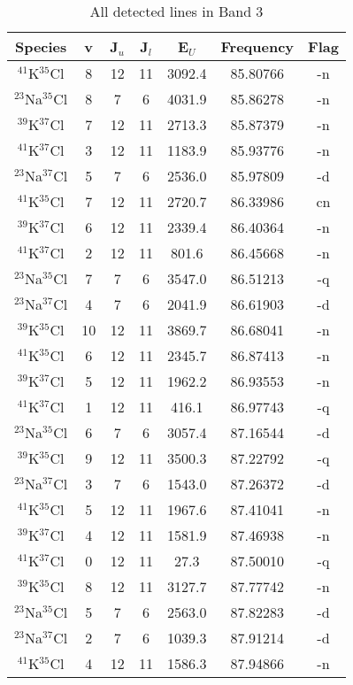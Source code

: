 \begin{table*}[htp]
\centering
\caption{All detected lines in Band 3}
\begin{tabular}{ccccccc}
\label{tab:all_detections_B3}
Species & v & J$_u$ & J$_l$ & E$_U$ & Frequency & Flag \\
\hline
$^{41}$K$^{35}$Cl & 8 & 12 & 11 & 3092.4 & 85.80766 & -n \\
$^{23}$Na$^{35}$Cl & 8 & 7 & 6 & 4031.9 & 85.86278 & -n \\
$^{39}$K$^{37}$Cl & 7 & 12 & 11 & 2713.3 & 85.87379 & -n \\
$^{41}$K$^{37}$Cl & 3 & 12 & 11 & 1183.9 & 85.93776 & -n \\
$^{23}$Na$^{37}$Cl & 5 & 7 & 6 & 2536.0 & 85.97809 & -d \\
$^{41}$K$^{35}$Cl & 7 & 12 & 11 & 2720.7 & 86.33986 & cn \\
$^{39}$K$^{37}$Cl & 6 & 12 & 11 & 2339.4 & 86.40364 & -n \\
$^{41}$K$^{37}$Cl & 2 & 12 & 11 & 801.6 & 86.45668 & -n \\
$^{23}$Na$^{35}$Cl & 7 & 7 & 6 & 3547.0 & 86.51213 & -q \\
$^{23}$Na$^{37}$Cl & 4 & 7 & 6 & 2041.9 & 86.61903 & -d \\
$^{39}$K$^{35}$Cl & 10 & 12 & 11 & 3869.7 & 86.68041 & -n \\
$^{41}$K$^{35}$Cl & 6 & 12 & 11 & 2345.7 & 86.87413 & -n \\
$^{39}$K$^{37}$Cl & 5 & 12 & 11 & 1962.2 & 86.93553 & -n \\
$^{41}$K$^{37}$Cl & 1 & 12 & 11 & 416.1 & 86.97743 & -q \\
$^{23}$Na$^{35}$Cl & 6 & 7 & 6 & 3057.4 & 87.16544 & -d \\
$^{39}$K$^{35}$Cl & 9 & 12 & 11 & 3500.3 & 87.22792 & -q \\
$^{23}$Na$^{37}$Cl & 3 & 7 & 6 & 1543.0 & 87.26372 & -d \\
$^{41}$K$^{35}$Cl & 5 & 12 & 11 & 1967.6 & 87.41041 & -n \\
$^{39}$K$^{37}$Cl & 4 & 12 & 11 & 1581.9 & 87.46938 & -n \\
$^{41}$K$^{37}$Cl & 0 & 12 & 11 & 27.3 & 87.50010 & -q \\
$^{39}$K$^{35}$Cl & 8 & 12 & 11 & 3127.7 & 87.77742 & -n \\
$^{23}$Na$^{35}$Cl & 5 & 7 & 6 & 2563.0 & 87.82283 & -d \\
$^{23}$Na$^{37}$Cl & 2 & 7 & 6 & 1039.3 & 87.91214 & -d \\
$^{41}$K$^{35}$Cl & 4 & 12 & 11 & 1586.3 & 87.94866 & -n \\

\end{tabular}
\end{table*}
